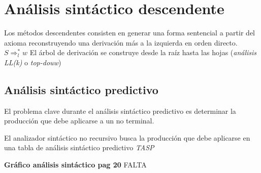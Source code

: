 %
%
%
%

\section{Análisis sintáctico descendente}

Los métodos descendentes consisten en generar una forma sentencial  a partir del axioma reconstruyendo una  derivación más a la izquierda en orden directo. $S\Rightarrow_{l}^{*}w$
El árbol de derivación se construye desde la raíz hasta las hojas (\textit{análisis LL(k)} o \textit{top-douw})

\subsection{Análisis sintáctico predictivo}

El problema clave durante el análisis sintáctico predictivo es determinar la producción que debe aplicarse a un no terminal. 

El analizador sintáctico no recursivo  busca la producción que debe aplicarse en una tabla de análisis sintáctico predictivo \textit{TASP}

              \textbf{{\LARGE Gráfico análisis sintáctico pag 20}}
FALTA

